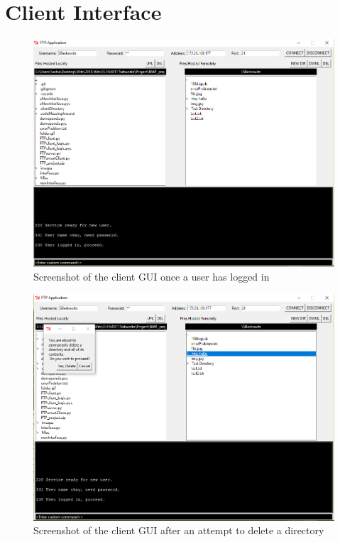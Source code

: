 \documentclass[10pt,twocolumn]{witseiepaper}
\begin{document}
\begin{appendix}
\begin{tabular}{|l|l|l|}
\end{tabular} 

\newpage

\section{Client Interface}\label{sec:GUIAppendix}
\setcounter{figure}{0} \renewcommand{\thefigure}{B\arabic{figure}}

\begin{figure}[H]
	\centering
	\includegraphics[width=0.8\columnwidth]{interface.png}
	\caption{Screenshot of the client GUI once a user has logged in}
	\raggedright
	\label{fig:ClientGUI}
\end{figure}

\begin{figure}[H]
	\centering
	\includegraphics[width=0.8\columnwidth]{delDir.png}
	\caption{Screenshot of the client GUI after an attempt to delete a directory}
	\raggedright
	\label{fig:ClientDel}
\end{figure}


\end{appendix}
\end{document}

